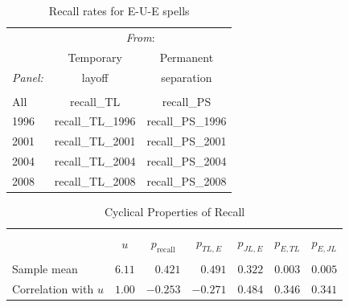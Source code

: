 \documentclass[12pt]{article}
\begin{document}

    \begin{table}
      \caption{Recall rates for E-U-E spells}
      \begin{center}
\begin{tabular}{l|cc}
  \hline \hline
   & \multicolumn{2}{c}{\textit{From}:} \\[0.35em]
                                     &\multicolumn{1}{c}{Temporary} & \multicolumn{1}{c}{Permanent} \\
   \textit{Panel:}                                  
                                     &\multicolumn{1}{c}{layoff} & 
                                     \multicolumn{1}{c}{separation} 
                                     \\[0.35em]
                                     \hline \\[-1em]
  All  & recall_TL & recall_PS \\[.35em]
  1996 & recall_TL_1996 & recall_PS_1996 \\[.35em]
  2001 & recall_TL_2001 & recall_PS_2001 \\[.35em]
  2004 & recall_TL_2004 & recall_PS_2004 \\[.35em]
  2008 & recall_TL_2008 & recall_PS_2008 \\[.35em]
               \hline
\end{tabular}
      \end{center}
    \end{table}

    \begin{table}
      \caption{Cyclical Properties of Recall}
      \begin{center}
    \begin{tabular}{l|rrrrrr}
      \hline
      \hline \\ [-1em] 
      & \multicolumn{1}{c}{$u$} & \multicolumn{1}{c}{$p_{\text{recall}}$} & \multicolumn{1}{c}{$p_{TL,E}$} & \multicolumn{1}{c}{$p_{JL,E}$} & \multicolumn{1}{c}{$p_{E,TL}$} & \multicolumn{1}{c}{$p_{E,JL}$} \\[0.35em]  
      \hline \\[-1em]
      Sample mean                 & $6.11$ & $0.421 $ & $0.491 $ & $0.322$ & $0.003$ & $0.005$ \\[.35em]
      Correlation with $u$ & $1.00$ & $-0.253$ & $-0.271$ & $0.484$ & $0.346$ & $0.341$ \\[.35em]
      \hline
      \hline
    \end{tabular}
      \end{center}
  \end{table}
\end{document}
